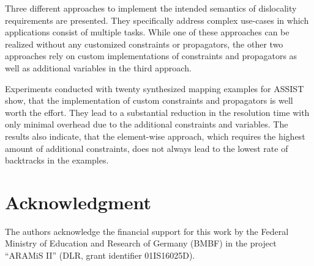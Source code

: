 \documentclass[conference]{IEEEtran}
\begin{document}
Three different approaches to implement the intended semantics of dislocality requirements are presented.
They specifically address complex use-cases in which applications consist of multiple tasks.
While one of these approaches can be realized without any customized constraints or propagators, the other two approaches rely on custom implementations of constraints and propagators as well as additional variables in the third approach.

Experiments conducted with twenty synthesized mapping examples for ASSIST show, that the implementation of custom constraints and propagators is well worth the effort.
They lead to a substantial reduction in the resolution time with only minimal overhead due to the additional constraints and variables.
The results also indicate, that the element-wise approach, which requires the highest amount of additional constraints, does not always lead to the lowest rate of backtracks in the examples.

\section*{Acknowledgment}

The authors acknowledge the financial support for this work by the Federal Ministry of Education and Research of Germany (BMBF) in the project ``ARAMiS II'' (DLR, grant identifier 01IS16025D).



\end{document}

